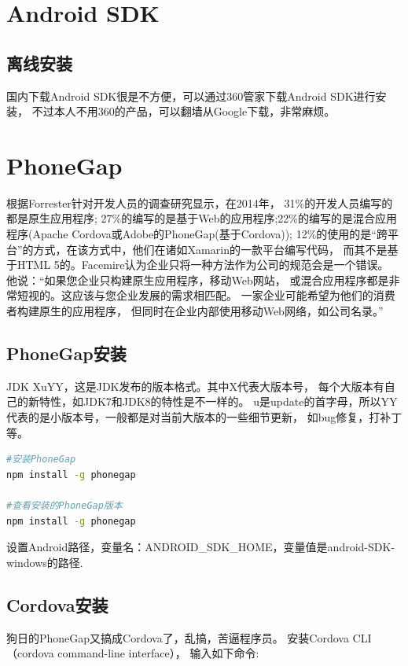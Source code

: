 \documentclass{book}
\begin{document}
\section{Android SDK}

\subsection{离线安装}

国内下载Android SDK很是不方便，可以通过360管家下载Android SDK进行安装，
不过本人不用360的产品，可以翻墙从Google下载，非常麻烦。


\section{PhoneGap}

根据Forrester针对开发人员的调查研究显示，在2014年，
31\%的开发人员编写的都是原生应用程序;
27\%的编写的是基于Web的应用程序;22\%的编写的是混合应用程序(Apache Cordova或Adobe的PhoneGap(基于Cordova));
12\%的使用的是“跨平台”的方式，在该方式中，他们在诸如Xamarin的一款平台编写代码，
而其不是基于HTML 5的。Facemire认为企业只将一种方法作为公司的规范会是一个错误。
他说：“如果您企业只构建原生应用程序，移动Web网站，
或混合应用程序都是非常短视的。这应该与您企业发展的需求相匹配。
一家企业可能希望为他们的消费者构建原生的应用程序，
但同时在企业内部使用移动Web网络，如公司名录。”

\subsection{PhoneGap安装}

JDK  XuYY，这是JDK发布的版本格式。其中X代表大版本号，
每个大版本有自己的新特性，如JDK7和JDK8的特性是不一样的。
u是update的首字母，所以YY代表的是小版本号，一般都是对当前大版本的一些细节更新，
如bug修复，打补丁等。

\begin{lstlisting}[language=Bash]
#安装PhoneGap
npm install -g phonegap

#查看安装的PhoneGap版本
npm install -g phonegap
\end{lstlisting}

设置Android路径，变量名：ANDROID\_SDK\_HOME，变量值是android-SDK-windows的路径.

\subsection{Cordova安装}

狗日的PhoneGap又搞成Cordova了，乱搞，苦逼程序员。
安装Cordova CLI（cordova command-line interface），
输入如下命令:
\end{document}

